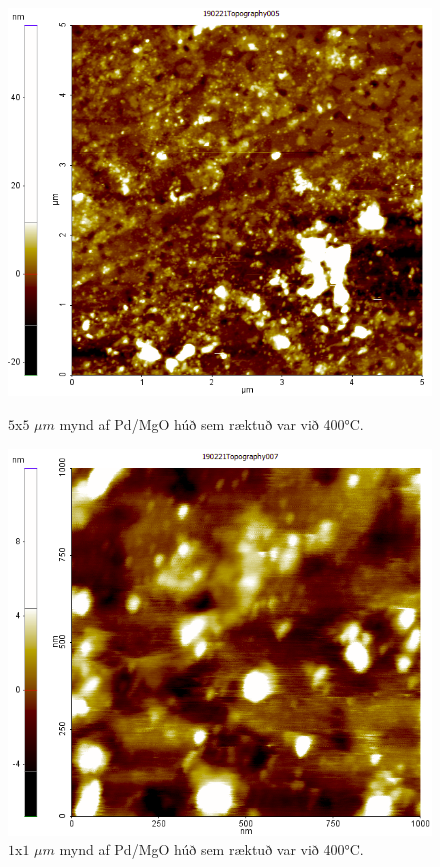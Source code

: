 \documentclass[11pt]{article}
\begin{document}
\begin{figure}[H]
  \centering
  \begin{minipage}[b]{0.48\textwidth}
    \includegraphics[width=\textwidth]{KEN002/Screenshot3.png}
    \caption{$5$x$5$ $\mu m$ mynd af Pd/MgO húð sem ræktuð var við \ang{400}C.}
    \label{fig:fjar400}
  \end{minipage}
  \hfill
  \begin{minipage}[b]{0.48\textwidth}
    \includegraphics[width=\textwidth]{KEN002/Screenshot4.png}
    \caption{$1$x$1$ $\mu m$ mynd af Pd/MgO húð sem ræktuð var við \ang{400}C.}
    \label{fig:naer400}
  \end{minipage}
\end{figure}
\end{document}

